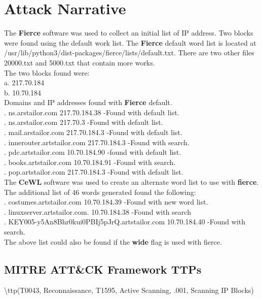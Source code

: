 \documentclass[notitlepage]{article}
\begin{document}
	\section{Attack Narrative}
	The \textbf{Fierce} software was used to collect an initial list of IP address. Two blocks were found using the default work list. The \textbf{Fierce} default word list is located at /usr/lib/python3/dist-packages/fierce/lists/default.txt.  There are two other files 20000.txt and 5000.txt that contain more works. \\
	The two blocks found were: \\
	\indent a. 217.70.184 \\
	\indent b. 10.70.184 \\
	Domains and IP addresses found with \textbf{Fierce} default.\\
	. ns.arstailor.com 217.70.184.38 -Found with default list. \\
	. ns.arstailor.com 217.70.3 -Found with default list. \\
	. mail.arstailor.com 217.70.184.3 -Found with default list. \\
	. innerouter.artstailor.com 217.70.184.3 -Found with search. \\
	. pdc.artstailor.com 10.70.184.90 -found with default list. \\
	. books.artstailor.com 10.70.184.91 -Found with search. \\
	. pop.artstailor.com 217.70.184.3 -Found with default list. \\
	The \textbf{CeWL} software was used to create an alternate word list to use with \textbf{fierce}. The additional list of 46 words generated found the following:\\
	. costumes.artstailor.com 10.70.184.39 -Found with new word list. \\
	. linuxserver.artstailor.com. 10.70.184.38 -Found with search \\
	. KEY005-y5An8Bhr0kui0PBIj5pJrQ.artstailor.com 10.70.184.40  -Found with search. \\
	The above list could also be found if the \textbf{wide} flag is used with fierce. 
	
	\subsection{MITRE ATT{\&}CK Framework TTPs}
	
	\indent\textbackslash ttp(T0043, Reconnaissance, T1595, Active Scanning, .001, Scanning IP Blocks) \\
	
\end{document}
